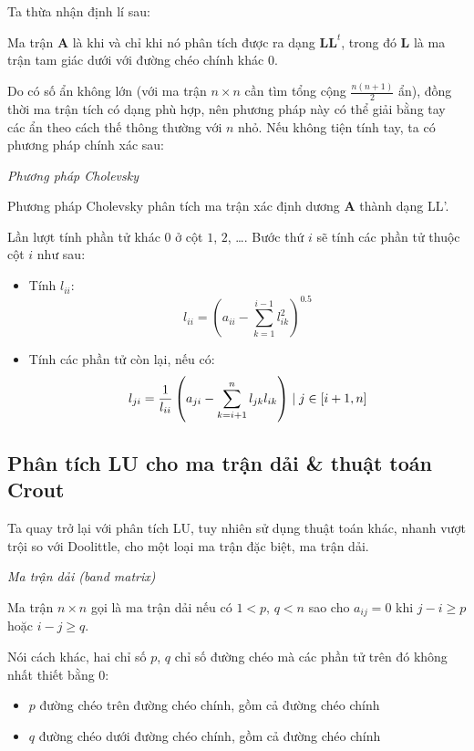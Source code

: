 \documentclass[../../Lectures]{subfiles}
\begin{document}
Ta thừa nhận định lí sau:

\begin{theorem}
    Ma trận \(\bm{A}\) là  khi và chỉ khi nó phân tích
    được ra dạng \(\bm{L} \bm{L}^t\), trong đó \(\bm{L}\) là ma trận tam giác
    dưới với đường chéo chính khác \(0\).
\end{theorem}

Do có số ẩn không lớn (với ma trận \(n \times n\) cần tìm tổng cộng \(\frac{n(n
+ 1)}{2}\) ẩn), đồng thời ma trận tích có dạng phù hợp, nên phương pháp này có
thể giải bằng tay các ẩn theo cách thế thông thường với \(n\) nhỏ. Nếu không
tiện tính tay, ta có phương pháp chính xác sau:

\begin{method}\label{method:cholevsky}
    \emph{Phương pháp Cholevsky}

    Phương pháp Cholevsky phân tích ma trận xác định dương \(\bm{A}\) thành dạng
    LL'.

    Lần lượt tính phần tử khác \(0\) ở cột \(1\), \(2\), \ldots. Bước thứ \(i\)
    sẽ tính các phần tử thuộc cột \(i\) như sau:
    \begin{itemize}
        \item Tính \(l_{ii}\):
            \[l_{ii} = \left(a_{ii} - \sum_{k = 1}^{i - 1} l_{ik}^2\right)^{\num{0.5}}\]

        \item Tính các phần tử còn lại, nếu có:
            \[l_{ji} = \frac{1}{l_{ii}} \left(a_{ji} - \sum_{k = i + 1}^{n} l_{jk} l_{ik}\right) \mid j \in \interval{i + 1}{n}\]
    \end{itemize}
\end{method}

\subsection{Phân tích LU cho ma trận dải \& thuật toán Crout}

Ta quay trở lại với phân tích LU, tuy nhiên sử dụng thuật toán khác, nhanh vượt
trội so với Doolittle, cho một loại ma trận đặc biệt, ma trận dải.

\begin{definition}
    \emph{Ma trận dải (band matrix)}

    Ma trận \(n \times n\) gọi là ma trận dải nếu có \(1 < p \text{, } q < n\)
    sao cho \(a_{ij} = 0\) khi \(j - i \geq p\) hoặc \(i - j \geq q\).
\end{definition}

Nói cách khác, hai chỉ số \(p\), \(q\) chỉ số đường chéo mà các phần tử trên đó
không nhất thiết bằng \(0\):
\begin{itemize}
    \item \(p\) đường chéo trên đường chéo chính, gồm cả đường chéo chính
    \item \(q\) đường chéo dưới đường chéo chính, gồm cả đường chéo chính
\end{itemize}
\end{document}
